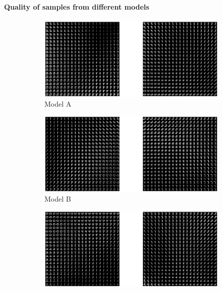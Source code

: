\paragraph{Quality of samples from different models}
\begin{figure}
\centering
    \begin{subfigure}[b]{0.9\textwidth}
    \includegraphics[width=\textwidth]{images/sampleWelling.eps}
    \vspace{-3\baselineskip}
    \caption{Model A}
    \label{fig:us-air}
    \end{subfigure}
	\begin{subfigure}[b]{0.9\textwidth}
    \includegraphics[width=\textwidth]{images/sampleNWdiag.eps}
    \vspace{-3\baselineskip}
    \caption{Model B}
    \label{fig:us-air}
    \end{subfigure}
    \begin{subfigure}[b]{0.9\textwidth}
    \includegraphics[width=\textwidth]{images/sampleNWblock.eps}

\end{subfigure}
\end{figure}
